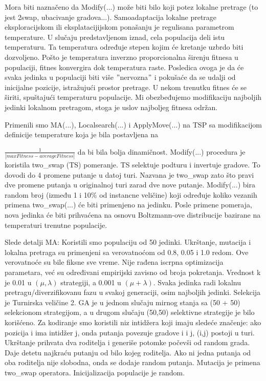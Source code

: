 \documentclass[a4paper]{article}
\begin{document}
Mora biti naznačeno da Modify(...) može biti bilo koji potez lokalne pretrage (to jest 2swap, ubacivanje gradova...). Samoadaptacija lokalne pretrage eksploracijskom ili eksplatacijijskom ponašanju je regulisana parametrom temperature. U slučaju predstavljenom iznad, cela populacija deli istu temperaturu. Ta temperatura određuje stepen kojim će kretanje uzbrdo biti dozvoljeno. Pošto je temperatura inverzno proporcionalna širenju fitnesa u populaciji, fitnes konvergira dok temperatura raste. Posledica ovoga je da će svaka jedinka u populaciji biti više $"$nervozna$"$ i pokušaće da se udalji od inicijalne pozicije, istražujući prostor pretrage. U nekom trenutku fitnes će se širiti, spuštajući temperaturu populacije. Mi obezbeđujemo modifikaciju najboljih jedinki lokalnom pretragom, stoga je uslov najboljeg fitnesa održan.  


Primenili smo MA(...), Localsearch(...) i ApplyMove(...) na TSP sa modifikacijom definicije temperature koja je bila postavljena na 

$\frac{1}{|maxFitness - averageFitness|}$ da bi bila bolja dinamičnost. Modify(...) procedura je koristila two\_swap (TS) pomeranje. TS selektuje podturu i invertuje gradove. To dovodi do 4 promene putanje u datoj turi. Nazvana je two\_swap zato što pravi dve promene putanja u originalnoj turi zarad dve nove putanje. Modify(...) bira random broj (između 1 i 10\% od instancne veličine) koji određuje koliko vezanih primena two\_swap(...) će biti primenjeno na jedinku. Posle primene pomeraja, nova jedinka će biti prihvaćena na osnovu Boltzmann-ove distribucije bazirane na temperaturi trenutne populacije. 

Slede detalji MA:
Koristili smo populaciju od 50 jedinki. Ukrštanje, mutacija i lokalna pretraga su  primenjeni sa verovatnoćom od 0.8, 0.05 i 1.0 redom. Ove verovatnoće su bile fiksne sve vreme. Nije rađena iscrpna optimizacija parametara, već su određivani empirijski zavisno od broja pokretanja. Vrednost k je 0.01 u $(\mu,\lambda)$ strategiji, a 0.001 u $(\mu + \lambda)$. Svaka jedinka radi lokalnu pretragu/diverzifikovanu fazu u svakoj generaciji, osim najboljih jedinki. Selekcija je Turnirska veličine 2. GA je u jednom slučaju mirnog stanja sa (50 + 50) selekcionom strategijom, a u drugom slučaju (50,50) selektivne strategije je bilo korišćeno. Za kodiranje smo koristili niz intidžera koji imaju sledeće značenje: ako pozicija i ima intidžer j, onda putanja povezuje gradove i i j, (i,j) postoji u turi. Ukrštanje prihvata dva roditelja i generiše potomke počevši od random grada. Daje detetu najkraću putanju od bilo kojeg roditelja. Ako ni jedna putanja od oba roditelja nije slobodna, onda se dodaje random putanja. Mutacija je primena two\_swap operatora. Inicijalizacija populacije je random. 
\end{document}
